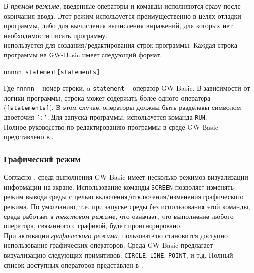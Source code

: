 \documentclass[12pt]{article}
\begin{document}
			\indent В {\it прямом режиме}, введенные операторы и команды исполняются сразу после окончания ввода. Этот режим используется преимущественно в целях отладки программы, либо для вычисления вычисления выражений, для которых нет необходимости писать программу. \\
			 используется для создания/редактирования строк программы. Каждая строка программы на GW-Basic имеет следующий формат:
			\begin{center}
				\tt nnnnn statement[statements]
			\end{center}

			\indent	Где {\tt nnnnn} -- номер строки, a {\tt statement} -- оператор GW-Basic. В зависимости от логики программы, строка может содержать более одного оператора ({\tt [statements]}). В этом случае, операторы должны быть разделены символом двоеточия {\tt ':'}. Для запуска программы, используется команда {\tt RUN}.\\
			\indent Полное руководство по редактированию программы в среде GW-Basic представлено в \cite[стр.~18]{basicManual}.

			\subsubsection{Графический режим}
			\label{subsec:graphixMode}
			\hspace{\parindent} Согласно \cite[стр.~142]{basicManual}, среда выполнения GW-Basic имеет несколько режимов визуализации информации на экране. Использование команды {\tt SCREEN} позволяет изменять режим вывода среды с целью включения/отключения/изменения графического режима. По умолчанию, т.е. при запуске среды без использования этой команды, среда работает в {\it текстовом режиме}, что означает, что выполнение любого оператора, связанного с графикой, будет проигнорировано. \\
			\indent При активации {\it графического режима}, пользователю становится доступно использование графических операторов. Среда GW-Basic предлагает визуализацию следующих примитивов: {\tt CIRCLE}, {\tt LINE}, {\tt POINT}, и т.д. Полный список доступных операторов представлен в \cite[стр.~117]{basicManual}. 
\end{document}
